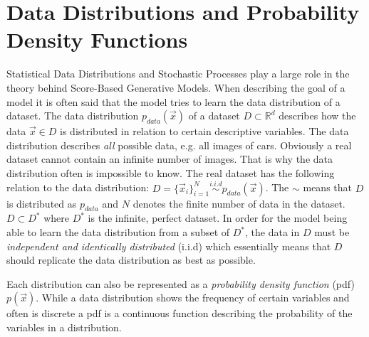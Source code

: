 \section[Data Distributions and Probability Density Functions]{Data Distributions and Probability Density Functions%
    } \label{sec:3.3}
Statistical Data Distributions and Stochastic Processes play a large role in the theory behind Score-Based Generative Models. When describing the goal of a model it is often said that the model tries to learn the data distribution of a dataset. The data distribution $p_{data}(\vec{x})$ of a dataset $D\subset\mathbb{R}^d$  describes how the data $\vec{x}\in D$ is distributed in relation to certain descriptive variables. The data distribution describes \textit{all} possible data, e.g. all images of cars. Obviously a real dataset cannot contain an infinite number of images. That is why the data distribution often is impossible to know. The real dataset has the following relation to the data distribution: $D=\{\vec{x}_i\}_{i=1}^N\overset{i.i.d}{\sim}p_{data}(\vec{x})$. The $\sim$ means that $D$ is distributed as $p_{data}$ and $N$ denotes the finite number of data in the dataset. $D\subset D^*$ where $D^*$ is the infinite, perfect dataset. In order for the model being able to learn the data distribution from a subset of $D^*$, the data in $D$ must be \textit{independent and identically distributed} (i.i.d) which essentially means that $D$ should replicate the data distribution as best as possible.

Each distribution can also be represented as a \textit{probability density function} (pdf) $p(\vec{x})$. While a data distribution shows the frequency of certain variables and often is discrete a pdf is a continuous function describing the probability of the variables in a distribution. 